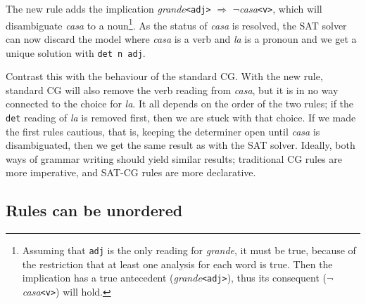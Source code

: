 The new rule adds the implication
 \emph{grande}\texttt{<adj>} $\Rightarrow$
 $\neg$\emph{casa}\texttt{<v>}, which will
disambiguate  \emph{casa} to a noun\footnote{Assuming that
  \texttt{adj} is the only reading for \emph{grande}, it must be true,
  because of the restriction that at least one analysis for each word
  is true. Then the implication has a true antecedent (\emph{grande}\texttt{<adj>}), thus its
  consequent ($\neg$\emph{casa}\texttt{<v>}) will hold.}. 
As the status of \emph{casa} is resolved, the SAT solver can now
discard the model where \emph{casa} is a verb and \emph{la} is a
pronoun
and we get a unique solution with \texttt{det n adj}.

Contrast this with the behaviour of the standard CG.
With the new rule, standard CG will also remove the verb reading from \emph{casa}, 
but it is in no way connected to the choice for \emph{la}. It all
depends on the order of the two rules; if the \texttt{det} reading of
\emph{la} is removed first, then we are stuck with that choice.
If we made the first rules cautious, that is, keeping the determiner
open until \emph{casa} is disambiguated, then we get the same
result as with the SAT solver.
Ideally, both ways of grammar writing should yield similar results;
traditional CG rules are more imperative, and SAT-CG
rules are more declarative.




\subsection{Rules can be unordered}
\label{sec:unord}


